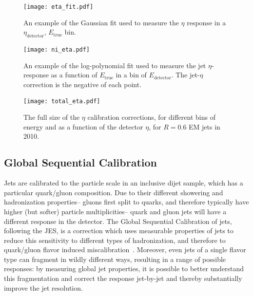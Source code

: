 
\begin{figure}
\centering
\texttt{[image: eta\_fit.pdf]}
\label{fig:jet-reconstruction:eta-fit}
\caption{An example of the Gaussian fit used to measure the $\eta$ response in a $\eta_\mathrm{detector}$, $E_\mathrm{true}$ bin.}
\end{figure}



\begin{figure}
\centering
\texttt{[image: ni\_eta.pdf]}
\label{fig:jet-reconstruction:ni-eta}
\caption{An example of the log-polynomial fit used to measure the jet $\eta$-response as a function of $E_\mathrm{true}$ in a bin of $E_\mathrm{detector}$. The jet-$\eta$ correction is the negative of each point.}
\end{figure}



\begin{figure}
\centering
\texttt{[image: total\_eta.pdf]}
\label{fig:jet-reconstruction:total-eta}
\caption{The full size of the $\eta$ calibration corrections, for different bins of energy and as a function of the detector $\eta$, for $R=0.6$ EM jets in 2010.}
\end{figure}




\subsection{Global Sequential Calibration}

Jets are calibrated to the particle scale in an inclusive dijet sample, which has a particular quark/gluon composition. Due to their different showering and hadronization properties-- gluons first split to quarks, and therefore typically have higher (but softer) particle multiplicities-- quark and gluon jets will have a different response in the detector. The Global Sequential Calibration of jets, following the JES, is a correction which uses measurable properties of jets to reduce this sensitivity to different types of hadronization, and therefore to quark/gluon flavor induced miscalibration~\cite{ATLAS-GSC}. Moreover, even jets of a single flavor type can fragment in wildly different ways, resulting in a range of possible responses: by measuring global jet properties, it is possible to better understand this fragmentation and correct the response jet-by-jet and thereby substantially improve the jet resolution.

